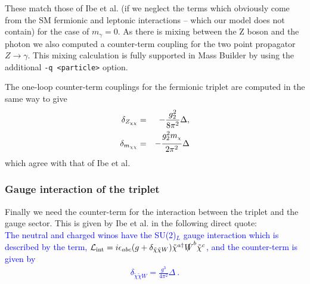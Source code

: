 \documentclass[11pt]{article}
\newcommand{\mychi}{\raisebox{0pt}[1ex][1ex]{\tiny$\chi$}}
\def\mc{m_{\mychi}}
\newcommand{\mb}{\textsf{Mass Builder} }
\begin{document}
These match those of Ibe et al. (if we neglect the terms which obviously come from the SM fermionic and leptonic interactions -- which our model does not contain) for the case of $m_{\gamma}=0$.  As there is mixing between the Z boson and the photon we also computed a counter-term coupling for the two point propagator $Z\rightarrow\gamma$.  This mixing calculation is fully supported in \mb by using the additional \lstinline{-q <particle>} option.

The one-loop counter-term couplings for the fermionic triplet are computed in the same way to give
\begin{eqnarray}
\delta_{Z_{\chi\chi}} &=&-\frac{g_2^2}{8 \pi^2}\Delta,\\
\delta_{m_{\chi\chi}} &=&-\frac{g_2^2 \mc}{2 \pi^2}\Delta
\end{eqnarray}
which agree with that of Ibe et al.


\subsubsection{Gauge interaction of the triplet}

Finally we need the counter-term for the interaction between the triplet and the gauge sector.  This is given by Ibe et al. \cite{Ibe2013a} in the following direct quote:\\

\textcolor{blue}{
The neutral and charged winos have the SU(2)$_L$ gauge interaction which is described by the term, ${\cal L}_{\rm int} = i\epsilon_{abc}(g + \delta_{\tilde{\chi} \tilde{\chi} W}) \tilde{\chi}^{a \dagger} \slashed{W}^b \tilde{\chi}^c$, and the counter-term is given by
\begin{eqnarray}
\delta_{\tilde{\chi} \tilde{\chi} W} = \frac{g^3}{4\pi^2} \Delta\ .
\end{eqnarray}
}
\end{document}
